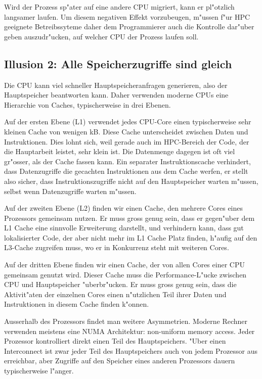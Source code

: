 Wird der Prozess sp"ater auf eine andere CPU migriert, kann er pl"otzlich
langsamer laufen. Um diesem negativen Effekt vorzubeugen, m"ussen
f"ur HPC geeignete Betreibssyteme daher dem Programmierer auch die
Kontrolle dar"uber geben auszudr"ucken, auf welcher CPU der Prozess laufen
soll.

\subsection{Illusion 2: Alle Speicherzugriffe sind gleich}
Die CPU kann viel schneller Hauptspeicheranfragen generieren, also der
Hauptspeicher beantworten kann.
Daher verwenden moderne CPUs eine Hierarchie von Caches, typischerweise
in drei Ebenen.

Auf der ersten Ebene (L1) verwendet
jedes CPU-Core einen typischerweise sehr kleinen Cache von wenigen
kB. Diese Cache unterscheidet zwischen Daten und Instruktionen.
Dies lohnt sich, weil gerade auch im HPC-Bereich der Code, der die
Hauptarbeit leistet, sehr klein ist.
Die Datenmenge dagegen ist oft viel gr"osser, als der Cache fassen kann.
Ein separater Instruktionscache
verhindert, dass Datenzugriffe die gecachten Instruktionen aus dem
Cache werfen, er
stellt also sicher, dass Instruktionszugriffe nicht auf den
Hauptspeicher warten m"ussen, selbst wenn Datenzugriffe warten m"ussen.

Auf der zweiten Ebene (L2) finden wir einen Cache, den mehrere Cores eines
Prozessors gemeinsam nutzen.
Er muss gross genug sein, dass er gegen"uber
dem L1 Cache eine sinnvolle Erweiterung darstellt, und verhindern kann,
dass gut lokalisierter Code, der aber nicht mehr im L1 Cache Platz finden,
h"aufig auf den L3-Cache zugreifen muss, wo er in Konkurrenz steht mit
weiteren Cores.

Auf der dritten Ebene finden wir einen Cache, der von allen Cores einer
CPU gemeinsam genutzt wird. Dieser Cache muss die Performance-L"ucke
zwischen CPU und Hauptspeicher "uberbr"ucken.
Er muss gross genug sein, dass die Aktivit"aten der einzelnen Cores einen
n"utzlichen Teil ihrer Daten und Instruktionen in diesem Cache finden 
k"onnen. 

Ausserhalb des Prozessors findet man weitere Asymmetrien.
Moderne Rechner verwenden meistens eine NUMA Architektur:
non-uniform memory access.
Jeder Prozessor kontrolliert direkt einen Teil des Hauptspeichers.
"Uber einen Interconnect ist zwar jeder Teil des Hauptspeichers
auch von jedem Prozessor aus erreichbar, aber Zugriffe auf den
Speicher eines anderen Prozessors dauern typischerweise l"anger.

